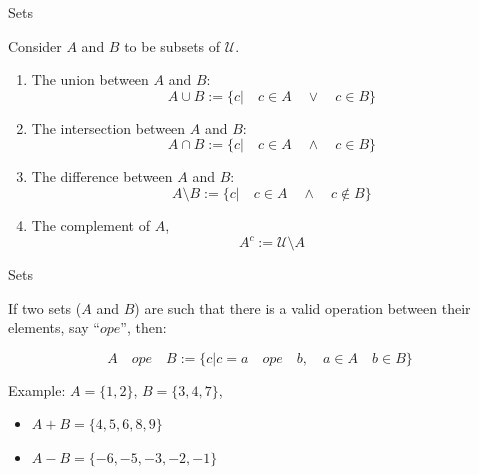 \documentclass[aspectratio=169]{beamer}
\begin{document}
\begin{frame}{Sets}
    \begin{definition}
        Consider $A$ and $B$ to be subsets of $\mathcal{U}$.
        \begin{enumerate}
            \item The union between $A$ and $B$: $$A\cup B:=\{c|\quad c\in A \quad\vee\quad c\in B\}$$
            \item The intersection between $A$ and $B$: $$A\cap B:=\{c|\quad c\in A \quad\wedge\quad c\in B\}$$
            \item The difference between $A$ and $B$:$$A\setminus B:=\{c|\quad c\in A \quad \wedge \quad c\notin B\}$$
            \item The complement of $A$, $$A^c:=\mathcal{U}\setminus A$$ 
        \end{enumerate}
    \end{definition}
\end{frame}

\begin{frame}{Sets}
    
    If two sets ($A$ and $B$) are such that there is a valid operation between their elements, say ``$ope$'', then:
    
    $$A \quad ope \quad B:=\{c|c= a\quad ope \quad b,\quad a\in A \quad b\in B\}$$
    
    Example: $A=\{1,2\}$, $B=\{3,4,7\}$,
    \begin{itemize}
        \item $A+B=\{4,5,6,8,9\}$
        \item $A-B=\{-6,-5,-3,-2,-1\}$
    \end{itemize}
    
\end{frame}
\end{document}
